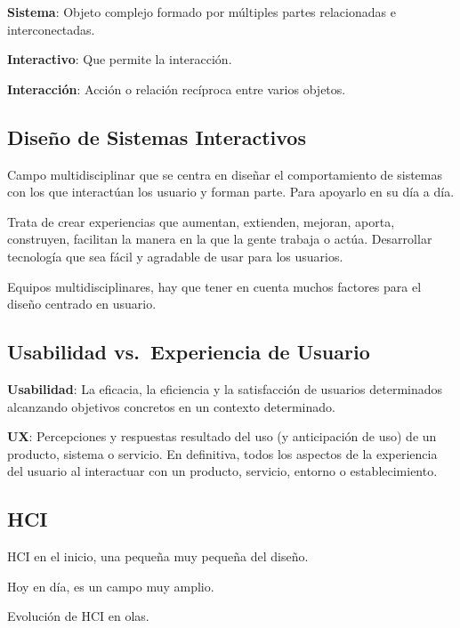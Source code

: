 \textbf{Sistema}: Objeto complejo formado por múltiples partes
relacionadas e interconectadas.

\textbf{Interactivo}: Que permite la interacción.

\textbf{Interacción}: Acción o relación recíproca entre varios objetos.

\hypertarget{diseuxf1o-de-sistemas-interactivos-1}{%
\subsection{Diseño de Sistemas
Interactivos}\label{diseuxf1o-de-sistemas-interactivos-1}}

Campo multidisciplinar que se centra en diseñar el comportamiento de
sistemas con los que interactúan los usuario y forman parte. Para
apoyarlo en su día a día.

Trata de crear experiencias que aumentan, extienden, mejoran, aporta,
construyen, facilitan la manera en la que la gente trabaja o actúa.
Desarrollar tecnología que sea fácil y agradable de usar para los
usuarios.

Equipos multidisciplinares, hay que tener en cuenta muchos factores para
el diseño centrado en usuario.

\hypertarget{usabilidad-vs.-experiencia-de-usuario}{%
\subsection{Usabilidad vs.~Experiencia de
Usuario}\label{usabilidad-vs.-experiencia-de-usuario}}

\textbf{Usabilidad}: La eficacia, la eficiencia y la satisfacción de
usuarios determinados alcanzando objetivos concretos en un contexto
determinado.

\textbf{UX}: Percepciones y respuestas resultado del uso (y anticipación
de uso) de un producto, sistema o servicio. En definitiva, todos los
aspectos de la experiencia del usuario al interactuar con un producto,
servicio, entorno o establecimiento.

\hypertarget{hci}{%
\subsection{HCI}\label{hci}}

HCI en el inicio, una pequeña muy pequeña del diseño.

Hoy en día, es un campo muy amplio.

Evolución de HCI en olas.

